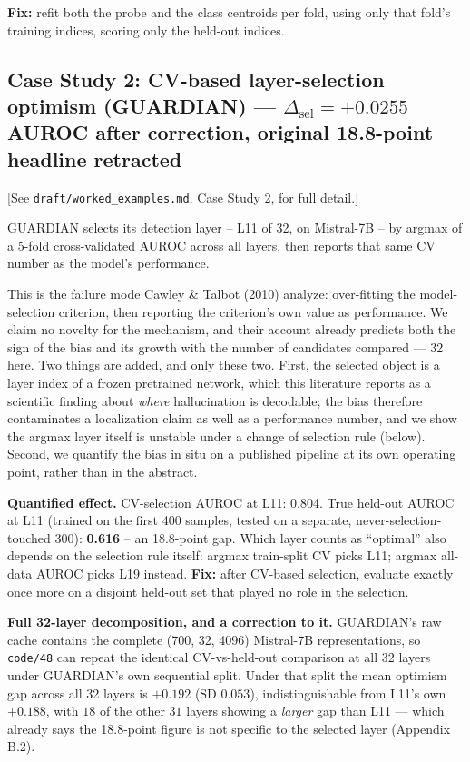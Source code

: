 \documentclass[10pt]{article} %
\begin{document}
\textbf{Fix:} refit both the probe and the class centroids per fold, using
only that fold's training indices, scoring only the held-out indices.

\subsection{Case Study 2: CV-based layer-selection optimism (GUARDIAN) --- $\Delta_{\text{sel}}=+0.0255$ AUROC after correction, original 18.8-point headline retracted}

[See \texttt{draft/worked\_examples.md}, Case Study 2, for full detail.]

GUARDIAN selects its detection layer -- L11 of 32, on Mistral-7B -- by
argmax of a 5-fold cross-validated AUROC across all layers, then reports
that same CV number as the model's performance.

This is the failure mode Cawley \& Talbot (2010) analyze: over-fitting the
model-selection criterion, then reporting the criterion's own value as
performance. We claim no novelty for the mechanism, and their account already
predicts both the sign of the bias and its growth with the number of candidates
compared --- 32 here. Two things are added, and only these two. First, the
selected object is a layer index of a frozen pretrained network, which this
literature reports as a scientific finding about \emph{where} hallucination is
decodable; the bias therefore contaminates a localization claim as well as a
performance number, and we show the argmax layer itself is unstable under a
change of selection rule (below). Second, we quantify the bias in situ on a
published pipeline at its own operating point, rather than in the abstract.

\textbf{Quantified effect.} CV-selection AUROC at L11: 0.804. True held-out
AUROC at L11 (trained on the first 400 samples, tested on a separate,
never-selection-touched 300): \textbf{0.616} -- an 18.8-point gap. Which layer
counts as ``optimal'' also depends on the selection rule itself: argmax
train-split CV picks L11; argmax all-data AUROC picks L19 instead.
\textbf{Fix:} after CV-based selection, evaluate exactly once more on a
disjoint held-out set that played no role in the selection.

\textbf{Full 32-layer decomposition, and a correction to it.} GUARDIAN's raw
cache contains the complete (700, 32, 4096) Mistral-7B representations, so
\texttt{code/48} can repeat the identical CV-vs-held-out comparison at all 32
layers under GUARDIAN's own sequential split. Under that split the mean
optimism gap across all 32 layers is $+0.192$ (SD $0.053$), indistinguishable
from L11's own $+0.188$, with $18$ of the other $31$ layers showing a
\emph{larger} gap than L11 --- which already says the 18.8-point figure is not
specific to the selected layer (Appendix B.2).
\end{document}
